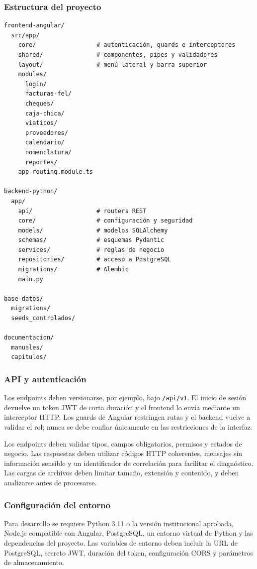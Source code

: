 \subsubsection{Estructura del proyecto}

\begin{verbatim}
frontend-angular/
  src/app/
    core/                 # autenticación, guards e interceptores
    shared/               # componentes, pipes y validadores
    layout/               # menú lateral y barra superior
    modules/
      login/
      facturas-fel/
      cheques/
      caja-chica/
      viaticos/
      proveedores/
      calendario/
      nomenclatura/
      reportes/
    app-routing.module.ts

backend-python/
  app/
    api/                  # routers REST
    core/                 # configuración y seguridad
    models/               # modelos SQLAlchemy
    schemas/              # esquemas Pydantic
    services/             # reglas de negocio
    repositories/         # acceso a PostgreSQL
    migrations/           # Alembic
    main.py

base-datos/
  migrations/
  seeds_controlados/

documentacion/
  manuales/
  capitulos/
\end{verbatim}

\subsubsection{API y autenticación}
Los endpoints deben versionarse, por ejemplo, bajo \texttt{/api/v1}. El inicio de sesión devuelve un token JWT de corta duración y el frontend lo envía mediante un interceptor HTTP. Los guards de Angular restringen rutas y el backend vuelve a validar el rol; nunca se debe confiar únicamente en las restricciones de la interfaz.

Los endpoints deben validar tipos, campos obligatorios, permisos y estados de negocio. Las respuestas deben utilizar códigos HTTP coherentes, mensajes sin información sensible y un identificador de correlación para facilitar el diagnóstico. Las cargas de archivos deben limitar tamaño, extensión y contenido, y deben analizarse antes de procesarse.

\subsubsection{Configuración del entorno}
Para desarrollo se requiere Python 3.11 o la versión institucional aprobada, Node.js compatible con Angular, PostgreSQL, un entorno virtual de Python y las dependencias del proyecto. Las variables de entorno deben incluir la URL de PostgreSQL, secreto JWT, duración del token, configuración CORS y parámetros de almacenamiento.


